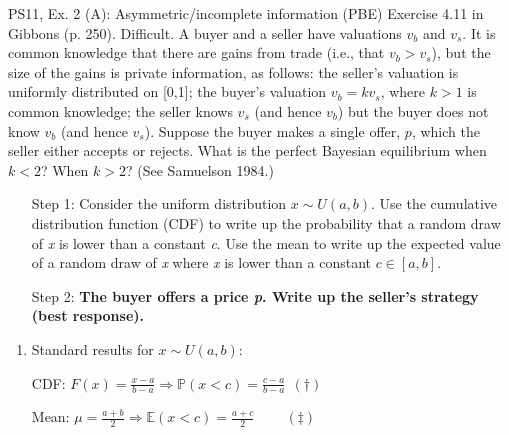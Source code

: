 \begin{frame}{PS11, Ex. 2 (A): Asymmetric/incomplete information (PBE)}
    Exercise 4.11 in Gibbons (p. 250). Difficult. A buyer and a seller have valuations $v_b$ and $v_s$. It is common knowledge that there are gains from trade (i.e., that $v_b > v_s$), but the size of the gains is private information, as follows: the seller’s valuation is uniformly distributed on [0,1]; the buyer’s valuation $v_b = kv_s$, where $k > 1$ is common knowledge; the seller knows $v_s$ (and hence $v_b$) but the buyer does not know $v_b$ (and hence $v_s$). Suppose the buyer makes a single offer, $p$, which the seller either accepts or rejects. What is the perfect Bayesian equilibrium when $k < 2$? When $k > 2$? (See Samuelson 1984.) \vspace{-8pt}
    \begin{multicols}{2}
      \begin{itemize}
        \item[Step 1:] Consider the uniform distribution $x\sim U(a, b)$. Use the cumulative distribution function (CDF) to write up the probability that a random draw of \textit{x} is lower than a constant \textit{c}. Use the mean to write up the expected value of a random draw of \textit{x} where \textit{x} is lower than a constant $c\in[a,b]$.
        \item[Step 2:] \textbf{The buyer offers a price \textit{p}. Write up the seller's strategy (best response).}
      \end{itemize}
      \vfill\null\columnbreak
      \begin{enumerate}
        \item Standard results for $x\sim U(a, b):$
        \item[CDF:] $F(x)=\frac{x-a}{b-a}\Rightarrow\mathbb{P}(x<c)=\frac{c-a}{b-a}\ \ (\dagger)$
        \item[Mean:] $\mu=\frac{a+b}{2}\Rightarrow\mathbb{E}(x<c)=\frac{a+c}{2}\quad\quad\ (\ddagger)$
      \end{enumerate}
      \vfill\null
    \end{multicols}
\end{frame}
